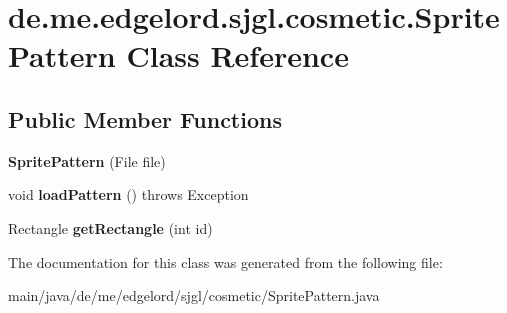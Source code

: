 \hypertarget{classde_1_1me_1_1edgelord_1_1sjgl_1_1cosmetic_1_1_sprite_pattern}{}\section{de.\+me.\+edgelord.\+sjgl.\+cosmetic.\+Sprite\+Pattern Class Reference}
\label{classde_1_1me_1_1edgelord_1_1sjgl_1_1cosmetic_1_1_sprite_pattern}
\subsection*{Public Member Functions}
\begin{DoxyCompactItemize}
\item 
\mbox{\label{classde_1_1me_1_1edgelord_1_1sjgl_1_1cosmetic_1_1_sprite_pattern_af5a440b77cbf76e4db793670ae3a652f}} 
{\bfseries Sprite\+Pattern} (File file)
\item 
\mbox{\label{classde_1_1me_1_1edgelord_1_1sjgl_1_1cosmetic_1_1_sprite_pattern_aced58a7ccb6c9d3ce888fd8b220c2c0c}} 
void {\bfseries load\+Pattern} ()  throws Exception 
\item 
\mbox{\label{classde_1_1me_1_1edgelord_1_1sjgl_1_1cosmetic_1_1_sprite_pattern_af7c4b88ce7fede4684575fcc4c8f294a}} 
Rectangle {\bfseries get\+Rectangle} (int id)
\end{DoxyCompactItemize}


The documentation for this class was generated from the following file\+:\begin{DoxyCompactItemize}
\item 
main/java/de/me/edgelord/sjgl/cosmetic/Sprite\+Pattern.\+java\end{DoxyCompactItemize}

